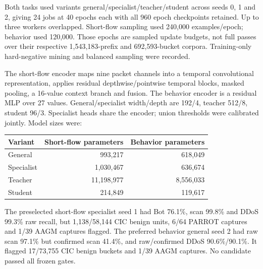 \documentclass[11pt,a4paper,oneside]{report}
\begin{document}
Both tasks used variants general/specialist/teacher/student across seeds 0, 1 and 2, giving 24 jobs at 40 epochs each with all 960 epoch checkpoints retained. Up to three workers overlapped. Short-flow sampling used 240,000 examples/epoch; behavior used 120,000. Those epochs are sampled update budgets, not full passes over their respective 1,543,183-prefix and 692,593-bucket corpora. Training-only hard-negative mining and balanced sampling were recorded.

The short-flow encoder maps nine packet channels into a temporal convolutional representation, applies residual depthwise/pointwise temporal blocks, masked pooling, a 16-value context branch and fusion. The behavior encoder is a residual MLP over 27 values. General/specialist width/depth are 192/4, teacher 512/8, student 96/3. Specialist heads share the encoder; union thresholds were calibrated jointly. Model sizes were:
\begin{center}\begin{tabular}{lrr}\toprule Variant & Short-flow parameters & Behavior parameters\\\midrule
General & 993,217 & 618,049\\
Specialist & 1,030,467 & 636,674\\
Teacher & 11,198,977 & 8,556,033\\
Student & 214,849 & 119,617\\\bottomrule\end{tabular}\end{center}

The preselected short-flow specialist seed 1 had Bot 76.1\%, scan 99.8\% and DDoS 99.3\% raw recall, but 1,138/58,144 CIC benign units, 6/64 PARROT captures and 1/39 AAGM captures flagged. The preferred behavior general seed 2 had raw scan 97.1\% but confirmed scan 41.4\%, and raw/confirmed DDoS 90.6\%/90.1\%. It flagged 17/73,755 CIC benign buckets and 1/39 AAGM captures. No candidate passed all frozen gates.
\end{document}
